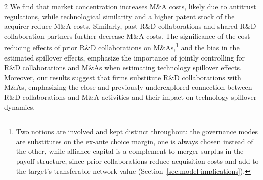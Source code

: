 \documentclass[12pt]{article}
\begin{document}
\begin{spacing}{2}
We find that market concentration increases M\&A costs, likely due to antitrust regulations, while technological similarity and a higher patent stock of the acquirer reduce M\&A costs. Similarly, past R\&D collaborations and shared R\&D collaboration partners further decrease M\&A costs. The significance of the cost-reducing effects of prior R\&D collaborations on M\&As,\footnote{Two notions are involved and kept distinct throughout: the governance modes are substitutes on the ex-ante choice margin, one is always chosen instead of the other, while alliance capital is a complement to merger surplus in the payoff structure, since prior collaborations reduce acquisition costs and add to the target's transferable network value (Section~\ref{sec:model-implications}).} and the bias in the estimated spillover effects, emphasize the importance of jointly controlling for R\&D collaborations and M\&As when estimating technology spillover effects. Moreover, our results suggest that firms substitute R\&D collaborations with M\&As, emphasizing the close and previously underexplored connection between R\&D collaborations and M\&A activities and their impact on technology spillover dynamics. %


\end{spacing}
\end{document}
